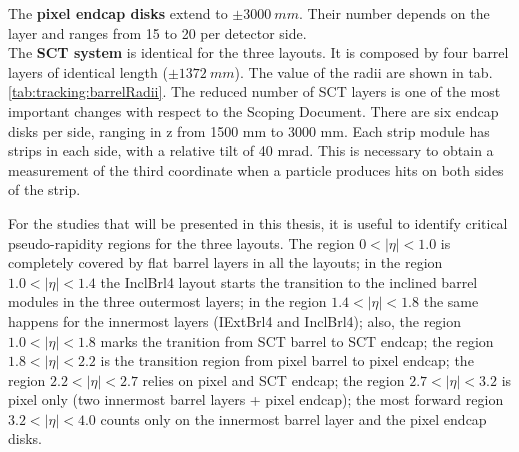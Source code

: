 \documentclass[a4paper,twoside,12pt]{article}
\begin{document}
The \textbf{pixel endcap disks} extend to $\pm 3000\ mm$. Their 
number depends on the layer and ranges from 15 to 20 per detector side. \\

The \textbf{SCT system} is identical for the three layouts. It is composed by four barrel layers of identical length ($\pm 1372\ mm$). The value of the radii are shown in tab. 
\ref{tab:tracking:barrelRadii}. The reduced number of SCT layers is one of the most important changes
with respect to the Scoping Document\cite{scoping}. There
are six endcap disks per side, ranging in z from 1500 mm to 3000 mm. Each strip module
has strips in each side, with a relative tilt of 40 mrad. This is necessary to obtain a
measurement of the third coordinate when a particle produces hits on both sides of the
strip.\\

\begin{table} [h]
\centering
	\caption{For the three Step-1 layouts considered, values of the barrel layers radii in the Pixel and SCT layers. The second pixel layer is 75 mm only for the ExtBrl4 layout, and is 
	85 mm in the IExtBrl4 and InclBrl4 layouts.}
	\label{tab:tracking:barrelRadii}
\end{table}

For the studies that will be presented in this thesis, it is useful to identify critical pseudo-rapidity regions for the three layouts. The region $0 < |\eta| < 1.0$ is completely covered by
flat barrel layers in all the layouts; in the region $1.0 < |\eta| < 1.4$ the InclBrl4 layout starts the transition to the inclined barrel modules in the three outermost layers; in the
region $1.4 < |\eta| < 1.8$ the same happens for the innermost layers (IExtBrl4 and InclBrl4); also, the region $1.0 < |\eta| < 1.8$ marks the tranition from SCT barrel to SCT endcap; the region $1.8 < |\eta| < 2.2$ is the transition region from pixel barrel to pixel endcap; the region $2.2 < |\eta| < 2.7$ relies on pixel and SCT endcap; the region $2.7 < |\eta| < 3.2$  is pixel only (two innermost barrel layers + pixel endcap); the most forward region $3.2 < |\eta| < 4.0$ counts only on the innermost barrel layer and the pixel endcap disks.\\
\end{document}
